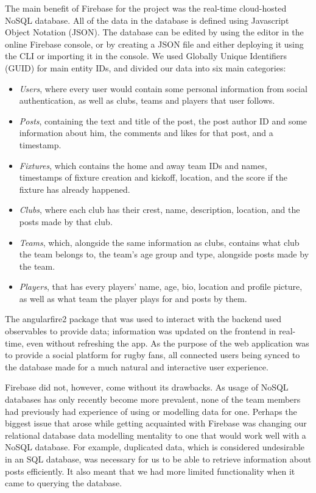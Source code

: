 \documentclass{l3proj}
\begin{document}
The main benefit of Firebase for the project was the real-time cloud-hosted
 NoSQL database. All of the data in the database is defined using Javascript
 Object Notation (JSON). The database can be edited by using the editor
 in the online Firebase console, or by creating a JSON file and either deploying
 it using the CLI or importing it in the console. We used Globally Unique
 Identifiers (GUID) for main entity IDs, and divided our data into six main categories:
\begin{itemize}
\item
\textit{Users}, where every user would contain some personal information
 from social authentication, as well as clubs, teams and players that user
 follows.

\item
\textit{Posts}, containing the text and title of the post, the post
 author ID and some information about him, the comments and likes for
 that post, and a timestamp.

\item
\textit{Fixtures}, which contains the home and away team IDs and names,
 timestamps of fixture creation and kickoff, location, and the score if
 the fixture has already happened.

\item
\textit{Clubs}, where each club has their crest, name, description,
location, and the posts made by that club.

\item
\textit{Teams}, which, alongside the same information as
clubs, contains what club the team belongs to, the team's age group and
type, alongside posts made by the team.

\item
\textit{Players}, that has every players' name, age, bio, location and
 profile picture, as well as what team the player plays for and posts
 by them.

\end{itemize}
The angularfire2 package that was used to interact with the backend used
 observables to provide data; information was updated on the frontend in
 real-time, even without refreshing the app. As the purpose of the web
 application was to provide a social platform for rugby fans, all connected
 users being synced to the database made for a much natural and interactive
 user experience.



Firebase did not, however, come without its drawbacks. As usage of NoSQL
 databases has only recently become more prevalent, none of the team members
 had previously had experience of using or modelling data for one. Perhaps
 the biggest issue that arose while getting acquainted with Firebase was
 changing our relational database data modelling mentality to one that would work
 well with a NoSQL database. For example, duplicated data, which is considered
 undesirable in an SQL database, was necessary for us to be able to retrieve
 information about posts efficiently. It also meant that we had more limited
 functionality when it came to querying the database.
\end{document}
